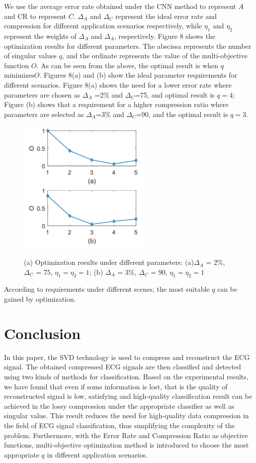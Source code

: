\documentclass[journal]{IEEEtran}
\begin{document}
We use the average error rate obtained under the CNN method to represent $A$ and CR to represent $C$. $\Delta_{A}$ and $\Delta_{C}$ represent the ideal error rate and compression for different application scenarios respectively, while $\eta_{1}$ and $\eta_{2}$ represent the weights of $\Delta_{A}$ and $\Delta_{A}$, respectively. Figure 8 shows the optimization results for different parameters. The abscissa represents the number of singular values $q$, and the ordinate represents the value of the multi-objective function $O$. As can be seen from the above, the optimal result is when $q$ minimizes$O$. Figures 8(a) and (b) show the ideal parameter requirements for different scenarios. Figure 8(a) shows the need for a lower error rate where parameters are chosen as $\Delta_{A}$ =2\% and $\Delta_{C}$=75, and optimal result is $q=4$; Figure (b) shows that a requirement for a higher compression ratio where parameters are selected as $\Delta_{A}$=3\% and $\Delta_{C}$=90, and the optimal result is $q=3$.

\begin{figure}
	\centering
	\includegraphics[width=6.5cm]{goal.pdf}\\
	\caption{(a) Optimization results under different parameters: (a)$\Delta_{A}$ = 2\%, $\Delta_{C}$ = 75, $\eta_{1} = \eta_{2}=1$; (b) $\Delta_{A}$ = 3\%, $\Delta_{C}$ = 90, $\eta_{1} = \eta_{2} =1$
}
	\label{CNNq2}
\end{figure}
According to requirements under different scenes, the most suitable $q$ can be gained by optimization.

\section{Conclusion}
In this paper, the SVD technology is used to compress and reconstruct the ECG signal. The obtained compressed ECG signals are then classified and detected using two kinds of methods for classification. Based on the experimental results, we have found that even if some information is lost, that is the quality of reconstructed signal is low, satisfying and high-quality classification result can be achieved in the lossy compression under the appropriate classifier as well as singular value. This result reduces the need for high-quality data compression in the field of ECG signal classification, thus simplifying the complexity of the problem. Furthermore, with the Error Rate and Compression Ratio as objective functions, multi-objective optimization method is introduced to choose the most appropriate $q$ in different application scenarios.
\end{document}
